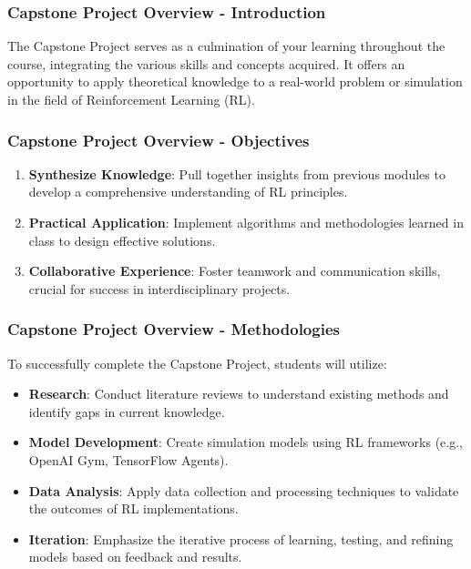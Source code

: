 \documentclass{beamer}
\begin{document}
\begin{frame}[fragile]
    \frametitle{Capstone Project Overview - Introduction}
    The Capstone Project serves as a culmination of your learning throughout the course, integrating the various skills and concepts acquired. 
    It offers an opportunity to apply theoretical knowledge to a real-world problem or simulation in the field of Reinforcement Learning (RL).
\end{frame}

\begin{frame}[fragile]
    \frametitle{Capstone Project Overview - Objectives}
    \begin{enumerate}
        \item \textbf{Synthesize Knowledge}: Pull together insights from previous modules to develop a comprehensive understanding of RL principles.
        \item \textbf{Practical Application}: Implement algorithms and methodologies learned in class to design effective solutions.
        \item \textbf{Collaborative Experience}: Foster teamwork and communication skills, crucial for success in interdisciplinary projects.
    \end{enumerate}
\end{frame}

\begin{frame}[fragile]
    \frametitle{Capstone Project Overview - Methodologies}
    To successfully complete the Capstone Project, students will utilize:
    \begin{itemize}
        \item \textbf{Research}: Conduct literature reviews to understand existing methods and identify gaps in current knowledge.
        \item \textbf{Model Development}: Create simulation models using RL frameworks (e.g., OpenAI Gym, TensorFlow Agents).
        \item \textbf{Data Analysis}: Apply data collection and processing techniques to validate the outcomes of RL implementations.
        \item \textbf{Iteration}: Emphasize the iterative process of learning, testing, and refining models based on feedback and results.
    \end{itemize}
\end{frame}
\end{document}
